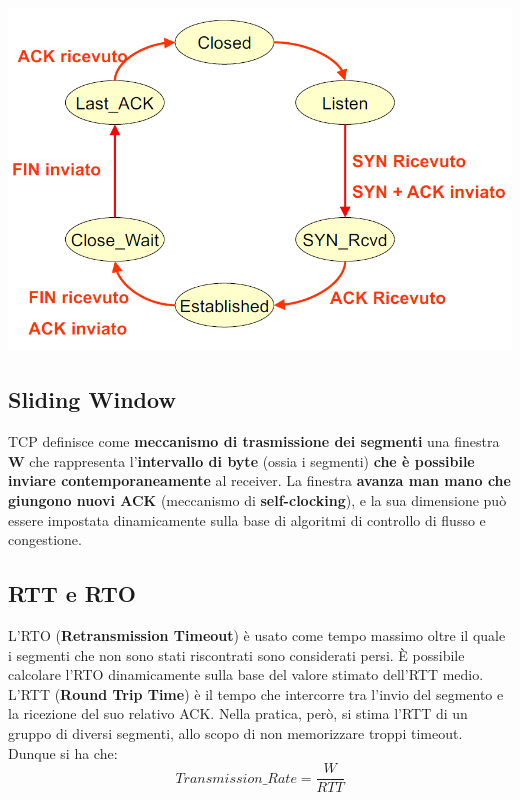 \documentclass[12pt]{article}
\begin{document}
\begin{center}
    \includegraphics[scale=0.5]{tcp_server_states}
\end{center}

\subsection{Sliding Window}

TCP definisce come \textbf{meccanismo di trasmissione dei segmenti} una finestra \textbf{W} che rappresenta l'\textbf{intervallo di byte} (ossia i segmenti) \textbf{che è possibile inviare contemporaneamente} al receiver. La finestra \textbf{avanza man mano che giungono nuovi ACK} (meccanismo di \textbf{self-clocking}), e la sua dimensione può essere impostata dinamicamente sulla base di algoritmi di controllo di flusso e congestione.

\subsection{RTT e RTO}

L'RTO (\textbf{Retransmission Timeout}) è usato come tempo massimo oltre il quale i segmenti che non sono stati riscontrati sono considerati persi. È possibile calcolare l'RTO dinamicamente sulla base del valore stimato dell'RTT medio. L'RTT (\textbf{Round Trip Time}) è il tempo che intercorre tra l'invio del segmento e la ricezione del suo relativo ACK. Nella pratica, però, si stima l'RTT di un gruppo di diversi segmenti, allo scopo di non memorizzare troppi timeout. Dunque si ha che:
\begin{equation*}
  Transmission\_Rate = \frac{W}{RTT} 
\end{equation*}
\end{document}
